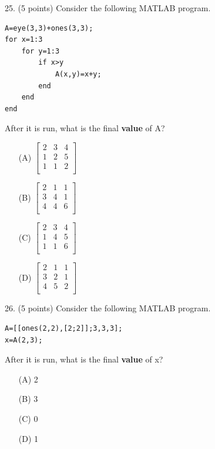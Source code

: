 \documentclass{article}
\begin{document}
\noindent
\begin{minipage}{\textwidth}
25. (5 points)
Consider the following MATLAB program.
\begin{verbatim}
A=eye(3,3)+ones(3,3);
for x=1:3
    for y=1:3
        if x>y
            A(x,y)=x+y;
        end
    end
end
\end{verbatim}
After it is run, what is the final \textbf{value} of A?

\begin{enumerate}
\item[(A)]
$ \left[ \begin{array}{ccc} 2 & 3 & 4 \\ 1 & 2 & 5 \\ 1 & 1 & 2  \\ \end{array} \right] $

\item[(B)]
$ \left[ \begin{array}{ccc} 2 & 1 & 1 \\ 3 & 4 & 1 \\ 4 & 4 & 6 \\ \end{array} \right] $

\item[(C)]
$ \left[ \begin{array}{ccc} 2 & 3 & 4 \\ 1 & 4 & 5 \\ 1 & 1 & 6  \\ \end{array} \right] $

\item[(D)]
$ \left[ \begin{array}{ccc} 2 & 1 & 1 \\ 3 & 2 & 1 \\ 4 & 5 & 2 \\ \end{array} \right] $

\end{enumerate}
\end{minipage}
\vspace{10em}
\filbreak\vfil{}\vfilneg

\noindent
\begin{minipage}{\textwidth}
26. (5 points)
Consider the following MATLAB program.
\begin{verbatim}
A=[[ones(2,2),[2;2]];3,3,3];
x=A(2,3);
\end{verbatim}
After it is run, what is the final \textbf{value} of x?

\begin{enumerate}
\item[(A)]
2

\item[(B)]
3

\item[(C)]
0

\item[(D)]
1

\end{enumerate}
\end{minipage}
\vspace{10em}
\filbreak\vfil{}\vfilneg
\end{document}
